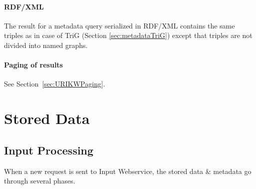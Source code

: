 \subsubsection{RDF/XML}
The result for a metadata query serialized in RDF/XML contains the same triples as in case of TriG (Section \ref{sec:metadataTriG}) except that triples are not divided into named graphs.

\subsubsection{Paging of results}
See Section~\ref{sec:URIKWPaging}.



\chapter{Stored Data}
\section{Input Processing}
\label{sec:inputProcessing}
When a new request is sent to Input Webservice, the stored data \& metadata go through several phases.

